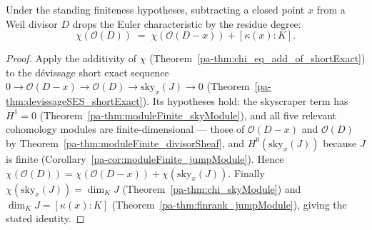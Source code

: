 \begin{theorem}
  \label{pa-thm:chi_step}
  \leanok

  Under the standing finiteness hypotheses, subtracting a closed point \(x\) from a Weil divisor
  \(D\) drops the Euler characteristic by the residue degree:
  \[
    \chi(\mathcal O(D)) \;=\; \chi(\mathcal O(D - x)) + [\kappa(x):K].
  \]
\end{theorem}
\begin{proof}
  \leanok
  Apply the additivity of \(\chi\) (Theorem~\ref{pa-thm:chi_eq_add_of_shortExact}) to the dévissage
  short exact sequence \(0 \to \mathcal O(D-x) \to \mathcal O(D) \to \mathrm{sky}_x(J) \to 0\)
  (Theorem~\ref{pa-thm:devissageSES_shortExact}). Its hypotheses hold: the skyscraper term has
  \(H^1 = 0\) (Theorem~\ref{pa-thm:moduleFinite_skyModule}), and all five relevant cohomology
  modules are finite-dimensional --- those of \(\mathcal O(D-x)\) and \(\mathcal O(D)\) by
  Theorem~\ref{pa-thm:moduleFinite_divisorSheaf}, and \(H^0(\mathrm{sky}_x(J))\) because \(J\) is
  finite (Corollary~\ref{pa-cor:moduleFinite_jumpModule}). Hence
  \(\chi(\mathcal O(D)) = \chi(\mathcal O(D-x)) + \chi(\mathrm{sky}_x(J))\). Finally
  \(\chi(\mathrm{sky}_x(J)) = \dim_K J\) (Theorem~\ref{pa-thm:chi_skyModule}) and
  \(\dim_K J = [\kappa(x):K]\) (Theorem~\ref{pa-thm:finrank_jumpModule}), giving the stated identity.
\end{proof}


